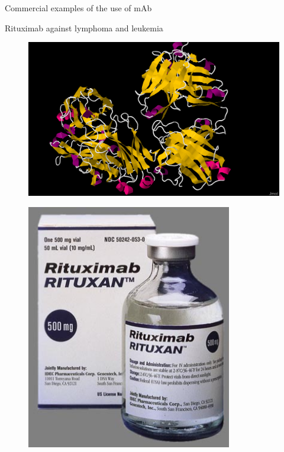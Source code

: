 \begin{frame}{Commercial examples of the use of mAb}
    \begin{block}{Rituximab against lymphoma and leukemia}
        \vspace{1em}
        \begin{minipage}{0.495\textwidth}
            \begin{figure}
                \centering
                \includegraphics[width=\textwidth]{../Images/Rituximab.png}
            \end{figure}  
        \end{minipage}\hfill
        \begin{minipage}{0.495\textwidth}
            \begin{figure}
                \centering
                \includegraphics[width=0.8\textwidth]{../Images/rituxan.jpg}
            \end{figure}    
        \end{minipage}
    \end{block}
\end{frame}

